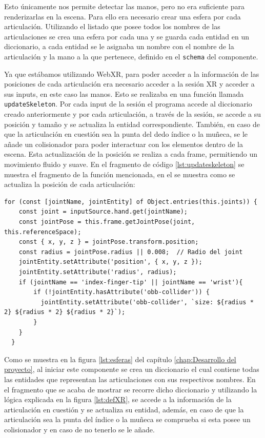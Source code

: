 \documentclass[a4paper, 12pt]{book}
\begin{document}
Esto únicamente nos permite detectar las manos, pero no era suficiente para renderizarlas en la escena. Para ello era necesario crear una esfera por cada articulación. Utilizando el listado que posee todos los nombres de las articulaciones se crea una esfera por cada una y se guarda cada entidad en un diccionario, a cada entidad se le asignaba un nombre con el nombre de la articulación y la mano a la que pertenece, definido en el \texttt{schema} del componente.

Ya que estábamos utilizando WebXR, para poder acceder a la información de las posiciones de cada articulación era necesario acceder a la sesión XR y acceder a sus inputs, en este caso las manos. Esto se realizaba en una función llamada \texttt{updateSkeleton}. Por cada input de la sesión el programa accede al diccionario creado anteriormente y por cada articulación, a través de la sesión, se accede a su posición y tamaño y se actualiza la entidad correspondiente. También, en caso de que la articulación en cuestión sea la punta del dedo índice o la muñeca, se le añade un colisionador para 
poder interactuar con los elementos dentro de la escena. Esta actualización de la posición se realiza a cada frame, permitiendo un movimiento fluido y suave. En el fragmento de código \ref{lst:updateskeleton} se muestra el fragmento de la función mencionada, en el se muestra como se actualiza la posición de cada articulación: 

\begin{lstlisting}[caption=Actualización de las manos en la escena, captionpos=b, label=lst:updateskeleton]
  for (const [jointName, jointEntity] of Object.entries(this.joints)) {
    const joint = inputSource.hand.get(jointName);
    const jointPose = this.frame.getJointPose(joint, this.referenceSpace);
    const { x, y, z } = jointPose.transform.position;
    const radius = jointPose.radius || 0.008;  // Radio del joint
    jointEntity.setAttribute('position', { x, y, z });
    jointEntity.setAttribute('radius', radius);
    if (jointName == 'index-finger-tip' || jointName == 'wrist'){
        if (!jointEntity.hasAttribute('obb-collider')) {
          jointEntity.setAttribute('obb-collider', `size: ${radius * 2} ${radius * 2} ${radius * 2}`);
        }
    }
  }
\end{lstlisting}

Como se muestra en la figura \ref{lst:esferas} del capítulo \ref{chap:Desarrollo del proyecto}, al iniciar este componente se crea un diccionario  el cual contiene todas las entidades que representan las articulaciones con sus respectivos nombres. En el fragmento que se acaba de mostrar se recorre dicho diccionario y utilizando la lógica explicada en la figura \ref{lst:defXR}, se accede a la información de la articulación en cuestión y se actualiza su entidad, además, en caso de que la articulación sea la punta del índice o la muñeca se comprueba si esta posee un colisionador y en caso de no tenerlo se le añade.
\end{document}

